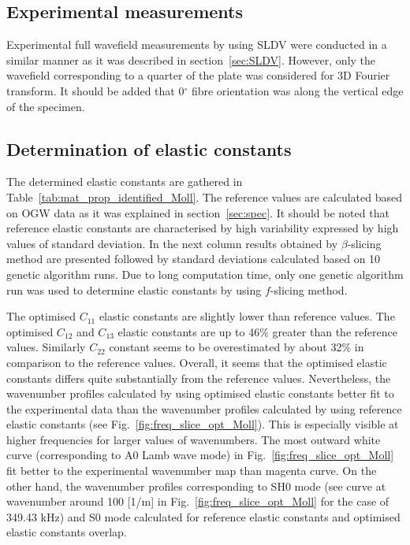 \documentclass[preprint,12pt]{elsarticle}
\begin{document}
\subsection{Experimental measurements}
Experimental full wavefield measurements by using SLDV were conducted in a similar manner as it was described in section~\ref{sec:SLDV}. 
However, only the wavefield corresponding to a quarter of the plate was considered for 3D Fourier transform.
It should be added that 0\(^{\circ}\) fibre orientation was along the vertical edge of the specimen.
\subsection{Determination of elastic constants}
The determined elastic constants are gathered in Table~\ref{tab:mat_prop_identified_Moll}.
The reference values are calculated based on OGW data as it was explained in section~\ref{sec:spec}.
It should be noted that reference elastic constants are characterised by high variability expressed by high values of standard deviation.
In the next column results obtained by $\beta$-slicing method are presented followed by standard deviations calculated based on 10 genetic algorithm runs.
Due to long computation time, only one genetic algorithm run was used to determine elastic constants by using $f$-slicing method.

The optimised $C_{11}$ elastic constants are slightly lower than reference values.
The optimised $C_{12}$ and $C_{13}$ elastic constants are up to 46\% greater than the reference values.
Similarly $C_{22}$ constant seems to be overestimated by about 32\% in comparison to the reference values.
Overall, it seems that the optimised elastic constants differs quite substantially from the reference values.
Nevertheless, the wavenumber profiles calculated by using optimised elastic constants better fit to the experimental data than the wavenumber profiles calculated by using reference elastic constants (see Fig.~\ref{fig:freq_slice_opt_Moll}).
This is especially visible at higher frequencies for larger values of wavenumbers.
The most outward white curve (corresponding to A0 Lamb wave mode) in Fig.~\ref{fig:freq_slice_opt_Moll} fit better to the experimental wavenumber map than magenta curve.
On the other hand, the wavenumber profiles corresponding to SH0 mode (see curve at wavenumber around 100 [1/m] in Fig.~\ref{fig:freq_slice_opt_Moll} for the case of 349.43 kHz) and S0 mode calculated for reference elastic constants and optimised elastic constants overlap.
\end{document}
